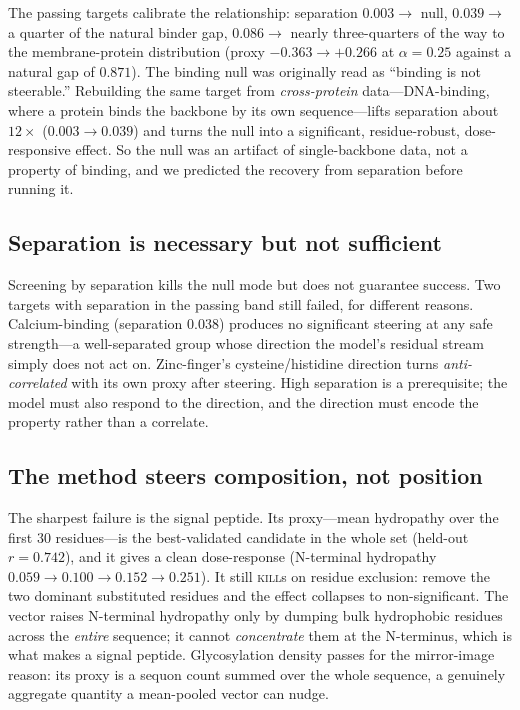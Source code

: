 \documentclass[11pt]{article}
\begin{document}
The passing targets calibrate the relationship: separation $0.003 \to$ null,
$0.039 \to$ a quarter of the natural binder gap, $0.086 \to$ nearly
three-quarters of the way to the membrane-protein distribution (proxy
$-0.363 \to +0.266$ at $\alpha=0.25$ against a natural gap of $0.871$). The
binding null was originally read as ``binding is not steerable.'' Rebuilding the
same target from \emph{cross-protein} data---DNA-binding, where a protein binds
the backbone by its own sequence---lifts separation about $12\times$ ($0.003
\to 0.039$) and turns the null into a significant, residue-robust,
dose-responsive effect. So the null was an artifact of single-backbone data, not
a property of binding, and we predicted the recovery from separation before
running it.

\subsection{Separation is necessary but not sufficient}

Screening by separation kills the null mode but does not guarantee success. Two
targets with separation in the passing band still failed, for different reasons.
Calcium-binding (separation $0.038$) produces no significant steering at any
safe strength---a well-separated group whose direction the model's residual
stream simply does not act on. Zinc-finger's cysteine/histidine direction turns
\emph{anti-correlated} with its own proxy after steering. High separation is a
prerequisite; the model must also respond to the direction, and the direction
must encode the property rather than a correlate.

\subsection{The method steers composition, not position}

The sharpest failure is the signal peptide. Its proxy---mean hydropathy over the
first 30 residues---is the best-validated candidate in the whole set (held-out
$r=0.742$), and it gives a clean dose-response (N-terminal hydropathy
$0.059 \to 0.100 \to 0.152 \to 0.251$). It still \textsc{kill}s on residue
exclusion: remove the two dominant substituted residues and the effect
collapses to non-significant. The vector raises N-terminal hydropathy only by
dumping bulk hydrophobic residues across the \emph{entire} sequence; it cannot
\emph{concentrate} them at the N-terminus, which is what makes a signal peptide.
Glycosylation density passes for the mirror-image reason: its proxy is a sequon
count summed over the whole sequence, a genuinely aggregate quantity a
mean-pooled vector can nudge.
\end{document}
